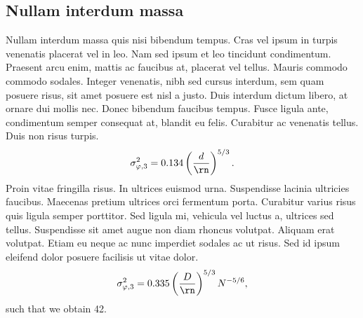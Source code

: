 \subsection{Nullam interdum massa}

Nullam interdum massa quis nisi bibendum tempus. Cras vel ipsum in turpis venenatis placerat vel in leo. Nam sed ipsum et leo tincidunt condimentum. Praesent arcu enim, mattis ac faucibus at, placerat vel tellus. Mauris commodo commodo sodales. Integer venenatis, nibh sed cursus interdum, sem quam posuere risus, sit amet posuere est nisl a justo. Duis interdum dictum libero, at ornare dui mollis nec. Donec bibendum faucibus tempus. Fusce ligula ante, condimentum semper consequat at, blandit eu felis. Curabitur ac venenatis tellus. Duis non risus turpis. 
\begin{equation}
	\label{eqn:3}
	\sigma_{\varphi, 3}^2 = 0.134 \left ( \frac{d}{\rn} \right )^{5/3}.
\end{equation}
Proin vitae fringilla risus. In ultrices euismod urna. Suspendisse lacinia ultricies faucibus. Maecenas pretium ultrices orci fermentum porta. Curabitur varius risus quis ligula semper porttitor. Sed ligula mi, vehicula vel luctus a, ultrices sed tellus. Suspendisse sit amet augue non diam rhoncus volutpat. Aliquam erat volutpat. Etiam eu neque ac nunc imperdiet sodales ac ut risus. Sed id ipsum eleifend dolor posuere facilisis  ut vitae dolor. 
\begin{equation}
	\label{eqn:4}
	\sigma_{\varphi, 3}^2 = 0.335 \left ( \frac{D}{\rn} \right )^{5/3} N^{-5/6},
\end{equation}
such that we obtain 42.
